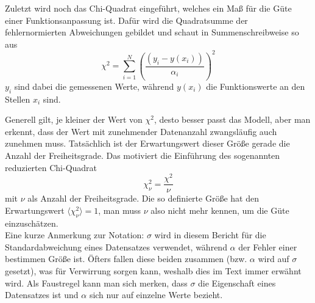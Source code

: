 Zuletzt wird noch das Chi-Quadrat eingeführt, welches ein Maß für die Güte einer Funktionsanpassung ist. Dafür wird die Quadratsumme der fehlernormierten Abweichungen gebildet und schaut in Summenschreibweise so aus
\begin{equation}\label{eqn:chi}
	\chi^2 = \sum_{i=1}^{N} \left(\frac{(y_i - y(x_i))}{\alpha_i}\right)^2
\end{equation}
\( y_i \) sind dabei die gemessenen Werte, während \( y(x_i) \) die Funktionswerte an den Stellen \( x_i \) sind. \cite[S. 65]{error}

Generell gilt, je kleiner der Wert von \( \chi^2 \), desto besser passt das Modell, aber man erkennt, dass der Wert mit zunehmender Datenanzahl zwangsläufig auch zunehmen muss. Tatsächlich ist der Erwartungswert dieser Größe gerade die Anzahl der Freiheitsgrade. Das motiviert die Einführung des sogenannten reduzierten Chi-Quadrat 
\begin{equation}\label{eqn:chinu}
	\chi_{\nu}^2 = \frac{\chi^2}{\nu}
\end{equation}
mit \( \nu \) als Anzahl der Freiheitsgrade.\cite[S. 107]{error} Die so definierte Größe hat den Erwartungswert \( \langle \chi_{\nu}^2 \rangle = 1 \), man muss \( \nu \) also nicht mehr kennen, um die Güte einzuschätzen. \\

Eine kurze Anmerkung zur Notation: \( \sigma \) wird in diesem Bericht für die Standardabweichung eines Datensatzes verwendet, während \( \alpha \) der Fehler einer bestimmen Größe ist. Öfters fallen diese beiden zusammen (bzw. \( \alpha \) wird auf \( \sigma \) gesetzt), was für Verwirrung sorgen kann, weshalb dies im Text immer erwähnt wird.
Als Faustregel kann man sich merken, dass \( \sigma \) die Eigenschaft eines Datensatzes ist und \( \alpha \) sich nur auf einzelne Werte bezieht.
